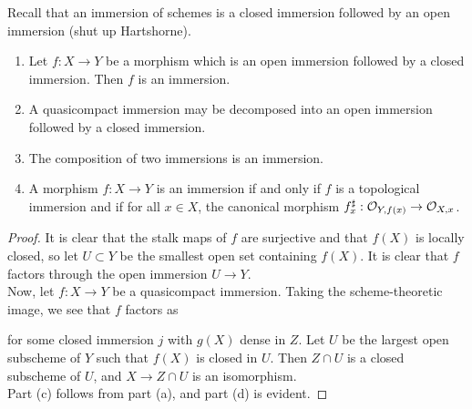\begin{exer}
	Recall that an immersion of schemes is a closed immersion followed by an
	open immersion (shut up Hartshorne).
	\begin{enumerate}[label=(\alph*)]
		\item Let $f: X \to Y$ be a morphism which is an open immersion
			followed by a closed immersion. Then $f$ is an
			immersion.
		\item A quasicompact immersion may be decomposed into an open
			immersion followed by a closed immersion.
		\item The composition of two immersions is an immersion.
		\item A morphism $f: X \to Y$ is an immersion if and only if $f$
			is a topological immersion and if for all $x \in X$, the
			canonical morphism $f^\sharp_x: \mathcal{O}_{Y,f(x)} \to
			\mathcal{O}_{X,x}$.
	\end{enumerate}
\end{exer}
\begin{proof}
	It is clear that the stalk maps of $f$ are surjective and that $f(X)$ is
	locally closed, so let $U \subset Y$ be the smallest open set containing
	$f(X)$. It is clear that $f$ factors through the open immersion $U \to
	Y$.\\

	Now, let $f: X \to Y$ be a quasicompact immersion. Taking the
	scheme-theoretic image, we see that $f$ factors as
	 for some
	closed immersion $j$ with $g(X)$ dense in $Z$. Let $U$ be the largest
	open subscheme of $Y$ such that $f(X)$ is closed in $U$. Then $Z \cap U$
	is a closed subscheme of $U$, and $X \to Z \cap U$ is an isomorphism.\\

	Part (c) follows from part (a), and part (d) is evident.
\end{proof}

